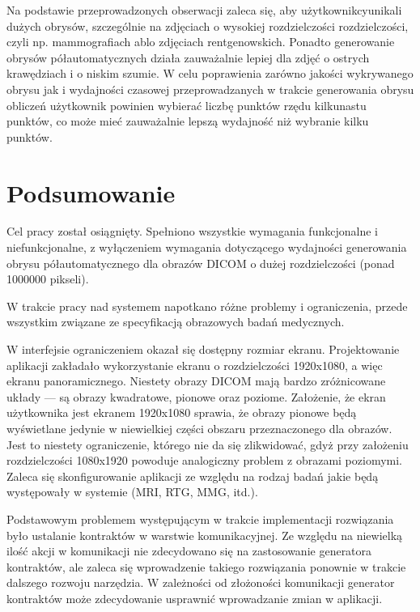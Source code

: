 \documentclass[a4paper,11pt,twoside,openright]{report}
\newcommand\blankpage{%
    \null
    \thispagestyle{empty}%
    \newpage}
\theoremstyle{definition}
\begin{document}
Na podstawie przeprowadzonych obserwacji zaleca się, aby użytkownikcyunikali
dużych obrysów, szczególnie na zdjęciach o wysokiej rozdzielczości rozdzielczości,
czyli np. mammografiach ablo zdjęciach rentgenowskich. Ponadto generowanie obrysów
półautomatycznych działa zauważalnie lepiej dla zdjęć o ostrych krawędziach i o
niskim szumie. W celu poprawienia zarówno jakości wykrywanego obrysu jak i
wydajności czasowej przeprowadzanych w trakcie generowania obrysu obliczeń użytkownik
powinien wybierać liczbę punktów rzędu kilkunastu punktów, co może mieć zauważalnie
lepszą wydajność niż wybranie kilku punktów.

\afterpage{\blankpage}
\chapter {Podsumowanie}


Cel pracy został osiągnięty. Spełniono wszystkie wymagania funkcjonalne i niefunkcjonalne,
z wyłączeniem wymagania dotyczącego wydajności generowania obrysu półautomatycznego
dla obrazów DICOM o dużej rozdzielczości (ponad 1000000 pikseli).

W trakcie pracy nad systemem napotkano różne problemy i ograniczenia, przede wszystkim
związane ze specyfikacją obrazowych badań medycznych.

W interfejsie ograniczeniem okazał się dostępny rozmiar ekranu. Projektowanie
aplikacji zakładało wykorzystanie ekranu o rozdzielczości 1920x1080, a więc ekranu
panoramicznego. Niestety obrazy DICOM mają bardzo zróżnicowane układy --- są obrazy
kwadratowe, pionowe oraz poziome. Założenie, że ekran użytkownika jest ekranem
1920x1080 sprawia, że obrazy pionowe będą wyświetlane jedynie w niewielkiej
części obszaru przeznaczonego dla obrazów. Jest to niestety ograniczenie, którego
nie da się zlikwidować, gdyż przy założeniu rozdzielczości 1080x1920 powoduje
analogiczny problem z obrazami poziomymi. Zaleca się skonfigurowanie aplikacji
ze względu na rodzaj badań jakie będą występowały w systemie (MRI, RTG, MMG, itd.).


Podstawowym problemem występującym w trakcie implementacji rozwiązania było
ustalanie kontraktów w warstwie komunikacyjnej. Ze względu na niewielką ilość
akcji w komunikacji nie zdecydowano się na zastosowanie generatora kontraktów,
ale zaleca się wprowadzenie takiego rozwiązania ponownie w trakcie dalszego rozwoju narzędzia.
W zależności od złożoności komunikacji generator kontraktów może zdecydowanie
usprawnić wprowadzanie zmian w aplikacji.
\end{document}
